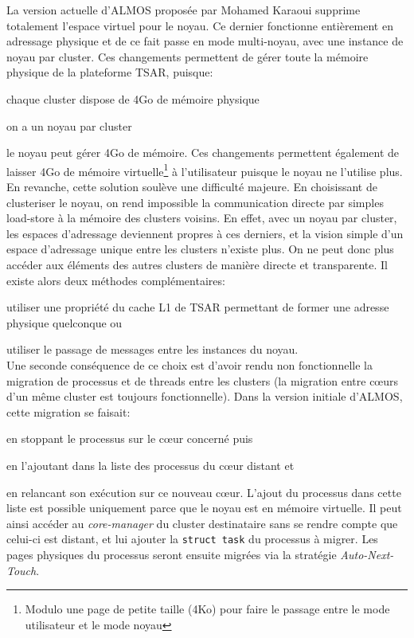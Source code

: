     La version actuelle d'ALMOS proposée par Mohamed Karaoui supprime totalement
    l'espace virtuel pour le noyau. Ce dernier fonctionne entièrement en
    adressage physique et de ce fait passe en mode multi-noyau, avec une
    instance de noyau par cluster. Ces changements permettent de gérer toute la
    mémoire physique de la plateforme TSAR, puisque: \benumline \item chaque
    cluster dispose de 4Go de mémoire physique \item on a un noyau par
    cluster \item le noyau peut gérer 4Go de mémoire\eenumline. Ces changements
    permettent également de laisser 4Go de mémoire virtuelle\footnote{Modulo une
      page de petite taille (4Ko) pour faire le passage entre le mode
      utilisateur et le mode noyau} à l'utilisateur puisque le noyau ne
    l'utilise plus.\\

    En revanche, cette solution soulève une difficulté majeure. En choisissant
    de clusteriser le noyau, on rend impossible la communication directe par
    simples load-store à la mémoire des clusters voisins. En effet, avec un
    noyau par cluster, les espaces d'adressage deviennent propres à ces
    derniers, et la vision simple d'un espace d'adressage unique entre les
    clusters n'existe plus. On ne peut donc plus accéder aux éléments des autres
    clusters de manière directe et transparente. Il existe alors deux méthodes
    complémentaires:\benumline \item utiliser une propriété du cache L1 de TSAR
    permettant de former une adresse physique quelconque ou \item utiliser le
    passage de messages entre les instances du noyau\eenumline.\\

    Une seconde conséquence de ce choix est d'avoir rendu non fonctionnelle la
    migration de processus et de threads entre les clusters (la migration entre
    c\oe urs d'un même cluster est toujours fonctionnelle). Dans la version
    initiale d'ALMOS, cette migration se faisait:\benumline \item en stoppant le
    processus sur le c\oe ur concerné puis \item en l'ajoutant dans la liste des
    processus du c\oe ur distant et \item en relancant son exécution sur ce
    nouveau c\oe ur\eenumline. L'ajout du processus dans cette liste est
    possible uniquement parce que le noyau est en mémoire virtuelle. Il peut
    ainsi accéder au \textit{core-manager} du cluster destinataire sans se
    rendre compte que celui-ci est distant, et lui ajouter la \texttt{struct
      task} du processus à migrer. Les pages physiques du processus seront
    ensuite migrées via la stratégie \textit{Auto-Next-Touch}.\\


